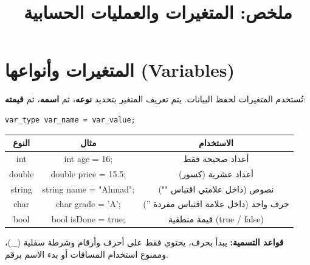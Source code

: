 \documentclass[14pt]{extarticle}
\title{ملخص: المتغيرات والعمليات الحسابية}
\begin{document}
\maketitle

\section{المتغيرات وأنواعها (\textenglish{Variables})}
تُستخدم المتغيرات لحفظ البيانات. يتم تعريف المتغير بتحديد \textbf{نوعه}، ثم \textbf{اسمه}، ثم \textbf{قيمته}:
\begin{boxCode}
\begin{english}
\begin{verbatim}
var_type var_name = var_value;
\end{verbatim}
\end{english}
\end{boxCode}

\begin{center}
\begin{tabular}{|c|c|c|}
\hline
\textbf{النوع} & \textbf{مثال} & \textbf{الاستخدام} \\
\hline
\textenglish{int} & \textenglish{int age = 16;} & أعداد صحيحة فقط \\
\hline
\textenglish{double} & \textenglish{double price = 15.5;} & أعداد عشرية (كسور) \\
\hline
\textenglish{string} & \textenglish{string name = "Ahmad";} & نصوص (داخل علامتي اقتباس \textenglish{""}) \\
\hline
\textenglish{char} & \textenglish{char grade = 'A';} & حرف واحد (داخل علامة اقتباس مفردة \textenglish{''}) \\
\hline
\textenglish{bool} & \textenglish{bool isDone = true;} & قيمة منطقية (\textenglish{true / false}) \\
\hline
\end{tabular}
\end{center}

\begin{boxNote}
\textbf{قواعد التسمية:} يبدأ بحرف، يحتوي فقط على أحرف وأرقام وشرطة سفلية (\textenglish{\_})، وممنوع استخدام المسافات أو بدء الاسم برقم.
\end{boxNote}
\end{document}

